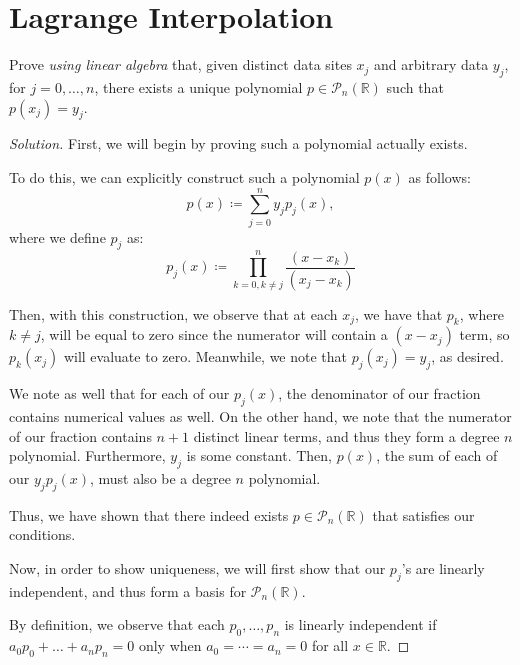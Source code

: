 \documentclass{article}
\newenvironment{solution}{\begin{proof}[Solution]}{\end{proof}}
\newcommand{\RR}{\mathbb{R}}
\begin{document}
	\section{Lagrange Interpolation}
	\begin{hw}
		Prove \textit{using linear algebra} that, given distinct data sites $x_{j}$ and arbitrary data $y_{j}$, for $j = 0, \ldots, n$, there exists a unique polynomial $p \in \mathscr{P}_{n}(\RR)$ such that $p(x_{j}) = y_{j}$.
	\end{hw}
	\begin{solution}
		First, we will begin by proving such a polynomial actually exists.
		
		To do this, we can explicitly construct such a polynomial $p(x)$ as follows:
		\begin{equation*}
		p(x) \coloneq \sum_{j=0}^{n} y_{j}p_{j}(x),
		\end{equation*}
		where we define $p_{j}$ as:
		\begin{equation*}
			p_{j}(x) \coloneq \prod_{k=0, k\neq j}^{n} \dfrac{(x-x_{k})}{(x_{j} - x_{k})}
		\end{equation*}
	
		Then, with this construction, we observe that at each $x_{j}$, we have that $p_{k}$, where $k \neq j$, will be equal to zero since the numerator will contain a $(x-x_{j})$ term, so $p_{k}(x_{j})$ will evaluate to zero. Meanwhile, we note that $p_{j}(x_{j}) = y_{j}$, as desired.
		
		We note as well that for each of our $p_{j}(x)$, the denominator of our fraction contains numerical values as well. On the other hand, we note that the numerator of our fraction contains $n+1$ distinct linear terms, and thus they form a degree $n$ polynomial. Furthermore, $y_{j}$ is some constant. Then, $p(x)$, the sum of each of our $y_{j}p_{j}(x)$, must also be a degree $n$ polynomial.
		
		Thus, we have shown that there indeed exists $p \in \mathscr P_{n}(\RR)$ that satisfies our conditions.
		
		Now, in order to show uniqueness, we will first show that our $p_{j}$'s are linearly independent, and thus form a basis for $\mathscr P_{n}(\RR)$.
		
		By definition, we observe that each $p_{0}, \ldots, p_{n}$ is linearly independent if $a_{0}p_{0} + \ldots + a_{n}p_{n} = 0$ only when $a_{0} = \cdots = a_{n} = 0$ for all $x \in \RR$.


\end{solution}
\end{document}
